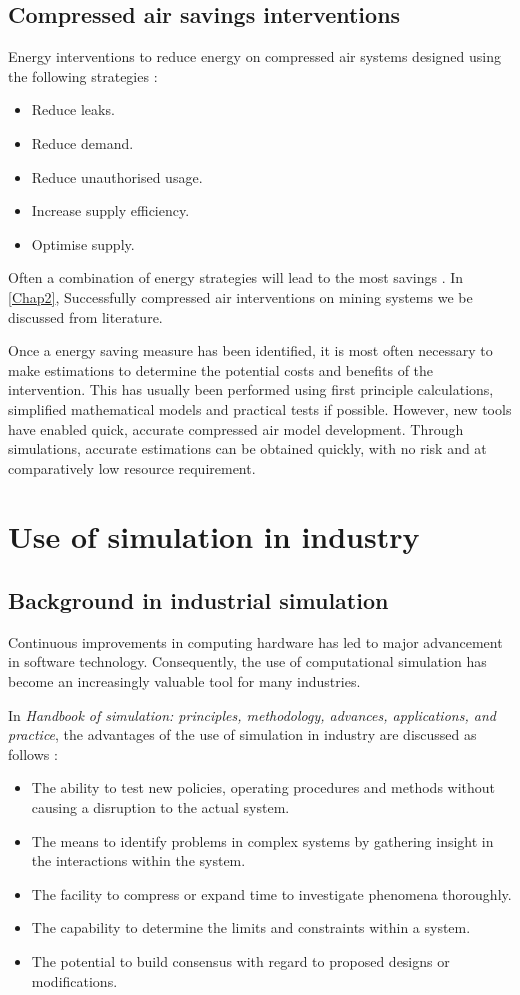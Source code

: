 	\subsection{Compressed air savings interventions}
		Energy interventions to reduce energy on compressed air systems designed using the following strategies \cite{Snyman2011Masters}:
		\begin{itemize}
			\item Reduce leaks.
			\item Reduce demand.
			\item Reduce unauthorised usage.
			\item Increase supply efficiency.
			\item Optimise supply.
		\end{itemize}
	 Often a combination of energy strategies will lead to the most savings \cite{Marais2012PhD}. In \cref{Chap2}, Successfully compressed air interventions on mining systems we be discussed from literature.
	 \par 
	 Once a energy saving measure has been identified, it is most often necessary to make estimations to determine the potential costs and benefits of the intervention. This has usually been performed using first principle calculations, simplified mathematical models and practical tests if possible. However, new tools have enabled quick, accurate compressed air model development. Through simulations, accurate estimations can be obtained quickly, with no risk and at comparatively low resource requirement.
\section{Use of simulation in industry }
	\subsection{Background in industrial simulation}
	
		Continuous improvements in computing hardware has led to major advancement in software technology. Consequently, the use of computational simulation has become an increasingly valuable tool for many industries.\cite{kocsis2003integration} \par 
		In \textit{ Handbook of simulation: principles, methodology, advances, applications, and practice}, the advantages of the use of simulation in industry are discussed as follows \cite{banks1998handbook}: %
		\begin{itemize}
			\item The ability to test new policies, operating procedures and methods without causing a disruption to the actual system.
			\item The means to identify problems in complex systems by gathering insight in the interactions within the system.
			\item The facility to compress or expand time to investigate phenomena thoroughly.
			\item The capability to determine the limits and constraints within a system.
			\item The potential to build consensus with regard to proposed designs or modifications.
		\end{itemize}

